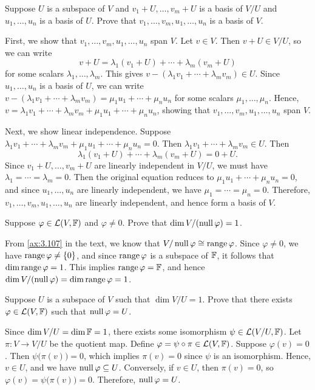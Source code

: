 \begin{exc}
\begin{exercise}
Suppose $U$ is a subspace of $V$ and $v_1+U,\dots,v_m+U$ is a basis of $V/U$
and $u_1,\dots,u_n$ is a basis of $U$. Prove that
$v_1,\dots,v_m,u_1,\dots,u_n$ is a basis of $V$.
\end{exercise}
\begin{solution}
First, we show that $v_1,\dots,v_m,u_1,\dots,u_n$ span $V$. Let $v\in V$. Then
$v+U\in V/U$, so we can write
\[ v+U = \lambda_1(v_1+U)+\cdots+\lambda_m(v_m+U) \]
for some scalars $\lambda_1,\dots,\lambda_m$. This gives
$v-(\lambda_1v_1+\cdots+\lambda_mv_m)\in U$. Since $u_1,\dots,u_n$ is a basis
of $U$, we can write $v-(\lambda_1v_1+\cdots+\lambda_mv_m)=\mu_1u_1+\cdots
+\mu_nu_n$ for some scalars $\mu_1,\dots,\mu_n$. Hence,
$v=\lambda_1v_1+\cdots+\lambda_mv_m+\mu_1u_1+\cdots+\mu_nu_n$, showing that
$v_1,\dots,v_m,u_1,\dots,u_n$ span $V$.

Next, we show linear independence. Suppose
$\lambda_1v_1+\cdots+\lambda_mv_m+\mu_1u_1+\cdots+\mu_nu_n=0$. Then
$\lambda_1v_1+\cdots+\lambda_mv_m\in U$. Then
\[ \lambda_1(v_1+U)+\cdots+\lambda_m(v_m+U) = 0+U. \]
Since $v_1+U,\dots,v_m+U$ are linearly independent in $V/U$, we must have
$\lambda_1=\cdots=\lambda_m=0$. Then the original equation reduces to
$\mu_1u_1+\cdots+\mu_nu_n=0$, and since $u_1,\dots,u_n$ are linearly
independent, we have $\mu_1=\cdots=\mu_n=0$. Therefore,
$v_1,\dots,v_m,u_1,\dots,u_n$ are linearly independent, and hence form a basis
of $V$.
\end{solution}

\begin{exercise}
Suppose $\varphi\in\mathcal{L}(V,\mathbb{F})$ and $\varphi\ne0$. Prove that
$\operatorname{dim} V/(\operatorname{null}\varphi)=1$.
\end{exercise}
\begin{solution}
From \ref{ax:3.107} in the text, we know that $V/\operatorname{null}\varphi\cong\operatorname{range}\varphi$.
Since $\varphi\ne0$, we have $\operatorname{range}\varphi\ne\{0\}$, and since $\operatorname{range}\varphi$
is a subspace of $\mathbb{F}$, it follows that $\operatorname{dim}\operatorname{range}\varphi=1$. This implies
$\operatorname{range}\varphi=\mathbb{F}$, and hence $\operatorname{dim} V/(\operatorname{null}\varphi)=\operatorname{dim}\operatorname{range}\varphi=1$.
\end{solution}

\begin{exercise}
Suppose $U$ is a subspace of $V$ such that $\dim V/U=1$. Prove that there exists
$\varphi\in\mathcal{L}(V,\mathbb{F})$ such that $\operatorname{null}\varphi=U$.
\end{exercise}
\begin{solution}
Since $\operatorname{dim} V/U=\operatorname{dim}\mathbb{F}=1$, there exists some isomorphism
$\psi\in\mathcal{L}(V/U,\mathbb{F})$. Let $\pi\colon V\to V/U$ be the quotient map. Define
$\varphi=\psi\circ\pi\in\mathcal{L}(V,\mathbb{F})$. Suppose $\varphi(v)=0$. Then
$\psi\bigl(\pi(v)\bigr)=0$, which implies $\pi(v)=0$ since $\psi$ is an
isomorphism. Hence, $v\in U$, and we have $\operatorname{null}\varphi\subseteq U$. Conversely,
if $v\in U$, then $\pi(v)=0$, so $\varphi(v)=\psi\bigl(\pi(v)\bigr)=0$.
Therefore, $\operatorname{null}\varphi=U$.
\end{solution}


\end{exc}
